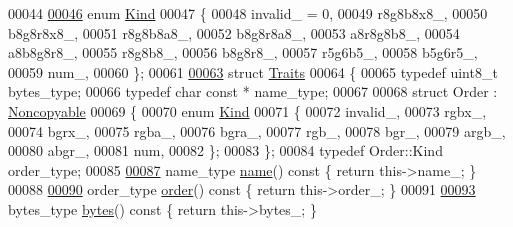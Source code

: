 \begin{DoxyCode}
00044 
\hypertarget{pixel__format_8h_source_l00046}{}\hyperlink{classhryky_1_1pixel_1_1_format_ac65267000940a3f9a74c01f82ed616e4}{00046}     \textcolor{keyword}{enum} \hyperlink{classhryky_1_1pixel_1_1_format_ac65267000940a3f9a74c01f82ed616e4}{Kind}
00047     \{
00048         invalid\_ = 0,
00049         r8g8b8x8\_,
00050         b8g8r8x8\_,
00051         r8g8b8a8\_,
00052         b8g8r8a8\_,
00053         a8r8g8b8\_,
00054         a8b8g8r8\_,
00055         r8g8b8\_,
00056         b8g8r8\_,
00057         r5g6b5\_,
00058         b5g6r5\_,
00059         num\_,
00060     \};
00061 
\hypertarget{pixel__format_8h_source_l00063}{}\hyperlink{structhryky_1_1pixel_1_1_format_1_1_traits}{00063}     \textcolor{keyword}{struct }\hyperlink{structhryky_1_1pixel_1_1_format_1_1_traits}{Traits}
00064     \{
00065         \textcolor{keyword}{typedef} uint8\_t         bytes\_type;
00066         \textcolor{keyword}{typedef} \textcolor{keywordtype}{char} \textcolor{keyword}{const} *    name\_type;
00067 
00068         \textcolor{keyword}{struct }Order : \hyperlink{classhryky_1_1_noncopyable}{Noncopyable}
00069         \{
00070             \textcolor{keyword}{enum} \hyperlink{classhryky_1_1pixel_1_1_format_ac65267000940a3f9a74c01f82ed616e4}{Kind}
00071             \{
00072                 invalid\_,
00073                 rgbx\_,
00074                 bgrx\_,
00075                 rgba\_,
00076                 bgra\_,
00077                 rgb\_,
00078                 bgr\_,
00079                 argb\_,
00080                 abgr\_,
00081                 num,
00082             \};
00083         \};
00084         \textcolor{keyword}{typedef} Order::Kind     order\_type;
00085 
\hypertarget{pixel__format_8h_source_l00087}{}\hyperlink{structhryky_1_1pixel_1_1_format_1_1_traits_a97fd4ec219a34e3bf68564fa09282eb8}{00087}         name\_type \hyperlink{structhryky_1_1pixel_1_1_format_1_1_traits_a97fd4ec219a34e3bf68564fa09282eb8}{name}()\textcolor{keyword}{ const }\{ \textcolor{keywordflow}{return} this->name\_; \}
00088 
\hypertarget{pixel__format_8h_source_l00090}{}\hyperlink{structhryky_1_1pixel_1_1_format_1_1_traits_a2adccc1b9f085b88aa595dad194f66da}{00090}         order\_type \hyperlink{structhryky_1_1pixel_1_1_format_1_1_traits_a2adccc1b9f085b88aa595dad194f66da}{order}()\textcolor{keyword}{ const }\{ \textcolor{keywordflow}{return} this->order\_; \}
00091 
\hypertarget{pixel__format_8h_source_l00093}{}\hyperlink{structhryky_1_1pixel_1_1_format_1_1_traits_a3aa3bca384e61fb00c2c043609dd7786}{00093}         bytes\_type \hyperlink{structhryky_1_1pixel_1_1_format_1_1_traits_a3aa3bca384e61fb00c2c043609dd7786}{bytes}()\textcolor{keyword}{ const }\{ \textcolor{keywordflow}{return} this->bytes\_; \}

\end{DoxyCode}
